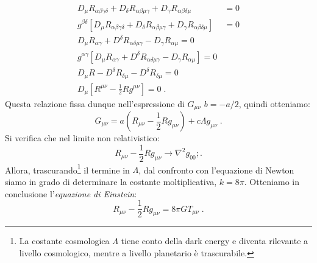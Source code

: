 \documentclass[12pt,a4paper]{report}
\theoremstyle{definition}
\begin{document}
\begin{align*}
D_{\mu}R_{\alpha\beta\gamma\delta}+D_{\delta}R_{\alpha\beta\mu\gamma}+D_{\gamma}R_{\alpha\beta\delta\mu}&= 0 \\
g^{\beta\delta}[D_{\mu}R_{\alpha\beta\gamma\delta}+D_{\delta}R_{\alpha\beta\mu\gamma}+D_{\gamma}R_{\alpha\beta\delta\mu}]&= 0 \\
D_{\mu}R_{\alpha\gamma}+D^{\delta}R_{\alpha\delta\mu\gamma}-D_{\gamma}R_{\alpha\mu}=0 \\
g^{\alpha\gamma}[D_{\mu}R_{\alpha\gamma}+D^{\delta}R_{\alpha\delta\mu\gamma}-D_{\gamma}R_{\alpha\mu}]=0 \\
D_{\mu}R-D^{\delta}R_{\delta\mu}-D^{\delta}R_{\delta\mu}=0 \\
D_{\mu}\left[R^{\mu\nu}-\frac{1}{2}Rg^{\mu\nu}\right]=0\;.
\end{align*}
Questa relazione fissa dunque nell'espressione di  $G_{\mu\nu}$ $b=-a/2$, quindi otteniamo:
\begin{equation}
G_{\mu\nu}=a\left(R_{\mu\nu}-\frac{1}{2}Rg_{\mu\nu}\right)+c\Lambda g_{\mu\nu}\;.
\end{equation}
Si verifica che nel limite non relativistico:
$$
R_{\mu\nu}-\frac{1}{2}Rg_{\mu\nu}\longrightarrow \nabla^2g_{00};.
$$
Allora, trascurando\footnote{La costante cosmologica $\Lambda$ tiene conto della dark energy e diventa rilevante a livello cosmologico, mentre a livello planetario è trascurabile.} il termine in $\Lambda$, dal confronto con l'equazione di Newton siamo in grado di determinare la costante moltiplicativa, $k=8\pi$. Otteniamo in conclusione l'\emph{equazione di Einstein}:
\begin{equation}
\boxed{
R_{\mu\nu}-\frac{1}{2}Rg_{\mu\nu}=8\pi GT_{\mu\nu}
}\;.
\end{equation}
\end{document}
